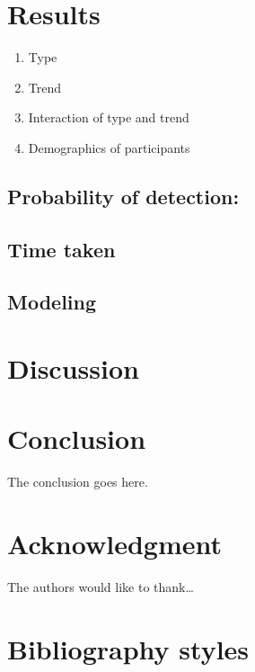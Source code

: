 \documentclass[conference,final,]{IEEEtran}
\providecommand{\tightlist}{%
  \setlength{\itemsep}{0pt}\setlength{\parskip}{0pt}}
\begin{document}
\hypertarget{results}{%
\section{Results}\label{results}}

\begin{enumerate}
\def\labelenumi{\arabic{enumi}.}
\tightlist
\item
  Type\\
\item
  Trend
\item
  Interaction of type and trend
\item
  Demographics of participants
\end{enumerate}

\hypertarget{probability-of-detection}{%
\subsection{Probability of detection:}\label{probability-of-detection}}

\hypertarget{time-taken}{%
\subsection{Time taken}\label{time-taken}}

\hypertarget{modeling}{%
\subsection{Modeling}\label{modeling}}

\hypertarget{discussion}{%
\section{Discussion}\label{discussion}}

\hypertarget{conclusion}{%
\section{Conclusion}\label{conclusion}}

The conclusion goes here.

\hypertarget{acknowledgment}{%
\section{Acknowledgment}\label{acknowledgment}}

The authors would like to thank\ldots{}

\hypertarget{bibliography-styles}{%
\section{Bibliography styles}\label{bibliography-styles}}
\end{document}

